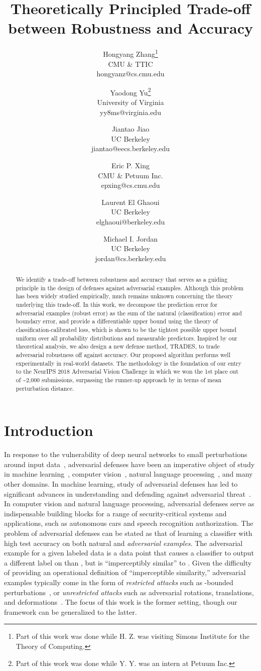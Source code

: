 \documentclass[11pt]{article}
\title{Theoretically Principled Trade-off between Robustness and Accuracy}
\author{
Hongyang Zhang\thanks{Part of this work was done while H. Z. was visiting Simons Institute
for the Theory of Computing.} \\ CMU \& TTIC \\ \small{hongyanz@cs.cmu.edu} \and
Yaodong Yu\thanks{Part of this work was done while Y. Y. was an intern at Petuum Inc.} \\ University of Virginia \\ \small{yy8ms@virginia.edu} \and
Jiantao Jiao \\ UC Berkeley \\
\small{jiantao@eecs.berkeley.edu} \and
Eric P. Xing \\ CMU \& Petuum Inc. \\
\small{epxing@cs.cmu.edu} \and
Laurent El Ghaoui \\ UC Berkeley \\
\small{elghaoui@berkeley.edu} \\ \and
Michael I. Jordan \\ UC Berkeley \\
\small{jordan@cs.berkeley.edu}
}
\date{}
\newcommand{\0}{\mathbf{0}}
\newcommand{\1}{\mathbf{1}}
\begin{document}
\maketitle


\begin{abstract}
We identify a trade-off between robustness and accuracy that serves as a guiding principle in the design of defenses against adversarial examples. Although this problem has been widely studied empirically, much remains unknown concerning the theory underlying this trade-off. In this work, we decompose the prediction error for adversarial examples (robust error) as the sum of the natural (classification) error and boundary error, and provide a differentiable upper bound using the theory of classification-calibrated loss, which is shown to be the tightest possible upper bound uniform over all probability distributions and measurable predictors. Inspired by our theoretical analysis, we also design a new defense method, TRADES, to trade adversarial robustness off against accuracy. Our proposed algorithm performs well experimentally in real-world datasets. The methodology is the foundation of our entry to the NeurIPS 2018 Adversarial Vision Challenge in which we won the 1st place out of \textasciitilde2,000 submissions, surpassing the runner-up approach by  in terms of mean  perturbation distance.
\end{abstract}


\section{Introduction}
In response to the vulnerability of deep neural networks to small perturbations around input data~\cite{szegedy2013intriguing}, adversarial defenses have been an imperative object of study in machine learning~\cite{huang2017adversarial}, computer vision~\cite{song2018pixeldefend,xie2017adversarial,meng2017magnet}, natural language processing~\cite{jia2017adversarial}, and many other domains. In machine learning, study of adversarial defenses has led to significant advances in understanding and defending against adversarial threat~\cite{he2017adversarial}. In computer vision and natural language processing, adversarial defenses serve as indispensable building blocks for a range of security-critical systems and applications, such as autonomous cars and speech recognition authorization. The problem of adversarial defenses can be stated as that of learning a classifier with high test accuracy on both natural and \emph{adversarial examples}. The adversarial example for a given labeled data  is a data point  that causes a classifier  to output a different label on  than , but is ``imperceptibly similar'' to . Given the difficulty of providing an operational definition of ``imperceptible similarity,''  adversarial examples typically come in the form of \emph{restricted attacks} such as -bounded perturbations~\cite{szegedy2013intriguing}, or \emph{unrestricted attacks} such as adversarial rotations, translations, and deformations~\cite{brown2018unrestricted,engstrom2017rotation,gilmer2018motivating,xiao2018spatially,alaifari2018adef,zhang2018limitations}. The focus of this work is the former setting, though our framework can be generalized to the latter. 
\end{document}

